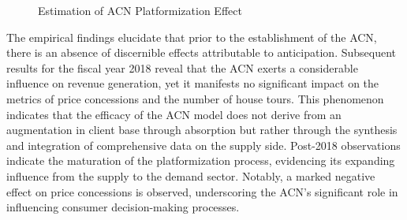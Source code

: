 \documentclass[12pt]{article}
\begin{document}
\begin{figure}[ht]
    \centering
    \hfill %
    \hfill %
    \caption{Estimation of ACN Platformization Effect}
    \label{fig:dynamic_effect}
\end{figure}

The empirical findings elucidate that prior to the establishment of the ACN, there is an absence of discernible effects attributable to anticipation. Subsequent results for the fiscal year 2018 reveal that the ACN exerts a considerable influence on revenue generation, yet it manifests no significant impact on the metrics of price concessions and the number of house tours. This phenomenon indicates that the efficacy of the ACN model does not derive from an augmentation in client base through absorption but rather through the synthesis and integration of comprehensive data on the supply side. Post-2018 observations indicate the maturation of the platformization process, evidencing its expanding influence from the supply to the demand sector. Notably, a marked negative effect on price concessions is observed, underscoring the ACN's significant role in influencing consumer decision-making processes.
\end{document}
